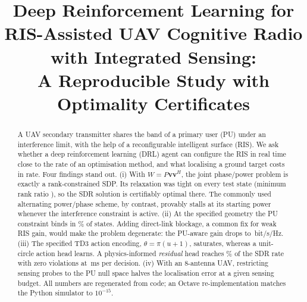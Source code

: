 \documentclass[conference]{IEEEtran}
\begin{document}
\title{Deep Reinforcement Learning for RIS-Assisted UAV Cognitive Radio with Integrated Sensing: \\ A Reproducible Study with Optimality Certificates}
\author{
}
\maketitle

\begin{abstract}
A UAV secondary transmitter shares the band of a primary user (PU) under an interference limit, with the help of a reconfigurable intelligent surface (RIS). We ask whether a deep reinforcement learning (DRL) agent can configure the RIS in real time close to the rate of an optimisation method, and what localising a ground target costs in rate. Four findings stand out. (i) With $W=P\mathbf{v}\mathbf{v}^H$, the joint phase/power problem is exactly a rank-constrained SDP. Its relaxation was tight on every test state (minimum rank ratio \RankMin), so the SDR solution is certifiably optimal there. The commonly used alternating power/phase scheme, by contrast, provably stalls at its starting power whenever the interference constraint is active. (ii) At the specified geometry the PU constraint binds in \BindZero\% of states. Adding direct-link blockage, a common fix for weak RIS gain, would make the problem degenerate: the PU-aware gain drops to \GainPUTen\,bit/s/Hz. (iii) The specified TD3 action encoding, $\theta=\pi(u+1)$, saturates, whereas a unit-circle action head learns. A physics-informed \emph{residual} head reaches \PctTDres\% of the SDR rate with zero violations at \TimeTDres\,ms per decision. (iv) With an 8-antenna UAV, restricting sensing probes to the PU null space halves the localisation error at a given sensing budget. All numbers are regenerated from code; an Octave re-implementation matches the Python simulator to $10^{-15}$.
\end{abstract}
\end{document}
